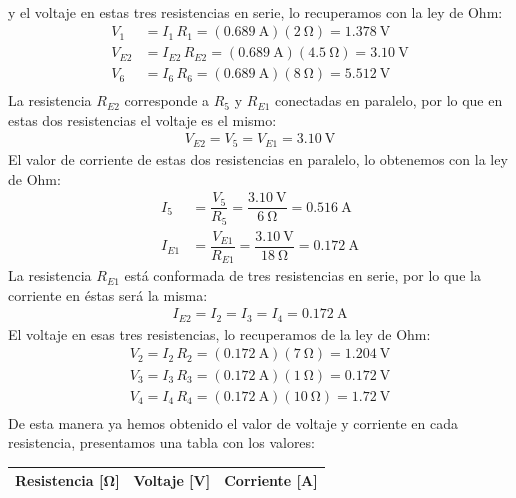 \documentclass[14pt]{extarticle}
\begin{document}
\begin{enumerate}
\begin{align*}
\end{align*}
y el voltaje en estas tres resistencias en serie, lo recuperamos con la ley de Ohm:
\begin{align*}
V_{1} &= I_{1} \, R_{1} = (\SI{0.689}{\ampere}) (\SI{2}{\ohm}) = \SI{1.378}{\volt} \\[0.5em]
V_{E2} &= I_{E2} \, R_{E2} = (\SI{0.689}{\ampere}) (\SI{4.5}{\ohm}) = \SI{3.10}{\volt} \\[0.5em]
V_{6} &= I_{6} \, R_{6} = (\SI{0.689}{\ampere}) (\SI{8}{\ohm}) = \SI{5.512}{\volt} \\[0.5em]
\end{align*}
La resistencia $R_{E2}$ corresponde a $R_{5}$ y $R_{E1}$ conectadas en paralelo, por lo que en estas dos resistencias el voltaje es el mismo:
\begin{align*}
V_{E2} = V_{5} = V_{E1} = \SI{3.10}{\volt}
\end{align*}
El valor de corriente de estas dos resistencias en paralelo, lo obtenemos con la ley de Ohm:
\begin{align*}
I_{5} &= \dfrac{V_{5}}{R_{5}} = \dfrac{\SI{3.10}{\volt}}{\SI{6}{\ohm}} = \SI{0.516}{\ampere} \\[0.5em]
I_{E1} &= \dfrac{V_{E1}}{R_{E1}} = \dfrac{\SI{3.10}{\volt}}{\SI{18}{\ohm}} = \SI{0.172}{\ampere}
\end{align*}
La resistencia $R_{E1}$ está conformada de tres resistencias en serie, por lo que la corriente en éstas será la misma:
\begin{align*}
I_{E2} = I_{2} = I_{3} = I_{4} = \SI{0.172}{\ampere}
\end{align*}
El voltaje en esas tres resistencias, lo recuperamos de la ley de Ohm:
\begin{align*}
V_{2} = I_{2} \, R_{2} = (\SI{0.172}{\ampere}) (\SI{7}{\ohm}) = \SI{1.204}{\volt} \\[0.5em]
V_{3} = I_{3} \, R_{3} = (\SI{0.172}{\ampere}) (\SI{1}{\ohm}) = \SI{0.172}{\volt} \\[0.5em]
V_{4} = I_{4} \, R_{4} = (\SI{0.172}{\ampere}) (\SI{10}{\ohm}) = \SI{1.72}{\volt} \\[0.5em]
\end{align*}
De esta manera ya hemos obtenido el valor de voltaje y corriente en cada resistencia, presentamos una tabla con los valores:
\begin{table}[H]
\centering
\renewcommand{\arraystretch}{1.1}
\begin{tabular}{| c | c | c |} \hline
Resistencia [\unit{\ohm}] & Voltaje [\unit{\volt}] & Corriente [\unit{\ampere}] \\ \hline

\end{tabular}
\end{table}
\end{enumerate}
\end{document}
